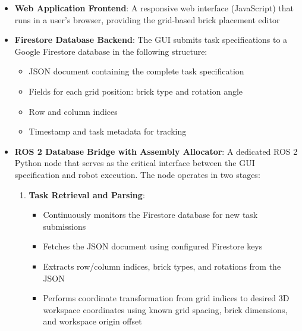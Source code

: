 \begin{itemize}
    \item \textbf{Web Application Frontend}: A responsive web interface (JavaScript) that runs in a user's browser, providing the grid-based brick placement editor
    
    \item \textbf{Firestore Database Backend}: The GUI submits task specifications to a Google Firestore database in the following structure:
    \begin{itemize}
        \item JSON document containing the complete task specification
        \item Fields for each grid position: brick type and rotation angle
        \item Row and column indices
        \item Timestamp and task metadata for tracking
    \end{itemize}
    
    \item \textbf{ROS 2 Database Bridge with Assembly Allocator}: A dedicated ROS 2 Python node that serves as the critical interface between the GUI specification and robot execution. The node operates in two stages:
    
    \begin{enumerate}
        \item \textbf{Task Retrieval and Parsing}:
        \begin{itemize}
            \item Continuously monitors the Firestore database for new task submissions
            \item Fetches the JSON document using configured Firestore keys
            \item Extracts row/column indices, brick types, and rotations from the JSON
            \item Performs coordinate transformation from grid indices to desired 3D workspace coordinates using known grid spacing, brick dimensions, and workspace origin offset
        \end{itemize}
        

\end{enumerate}
\end{itemize}
